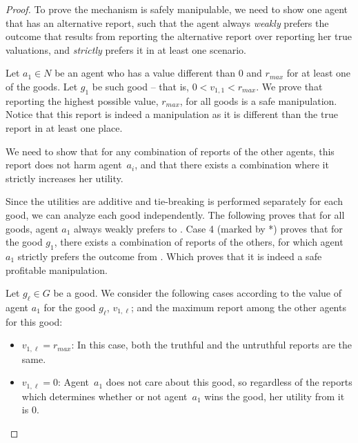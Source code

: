 \begin{proof}
    To prove the mechanism is safely manipulable, we need to show one agent that has an alternative report, such that the agent always \emph{weakly} prefers the outcome that results from reporting the alternative report over reporting her true valuations, and \emph{strictly} prefers it in at least one scenario.
    
     Let $a_1 \in N$ be an agent who has a value different than $0$ and $r_{max}$ for at least one of the goods. Let $g_1$ be such good -- that is, $0 < v_{1,1} < r_{max}$.
     We prove that reporting the highest possible value, $r_{max}$, for all goods is a safe manipulation.
     Notice that this report is indeed a manipulation as it is different than the true report in at least one place.
    
    We need to show that for any combination of reports of the other agents, this report does not harm agent~$a_i$, and that there exists a combination where it strictly increases her utility. 

Since the utilities are additive and tie-breaking is performed separately for each good, we can analyze each good independently. 
    The following proves that for all goods, agent $a_1$ always weakly prefers to . Case 4 (marked by *) proves that for the good $g_1$, there exists a combination of reports of the others, for which agent~$a_1$ strictly prefers the outcome from .
    Which proves that it is indeed a safe profitable manipulation. 

    
    Let $g_{\ell} \in G$ be a good. 
    We consider the following cases according to the value of agent $a_1$ for the good $g_{\ell}$, $v_{1, \ell}$; and the maximum report among the other agents for this good:
    \begin{itemize}
        \item $v_{1,\ell} = r_{max}$: In this case, both the truthful and the untruthful reports are the same.

        \item $v_{1,\ell} =0$: Agent~$a_1$ does not care about this good, so regardless of the reports which determines whether or not agent~$a_1$ wins the good, her utility from it is $0$.


\end{itemize}
\end{proof}
